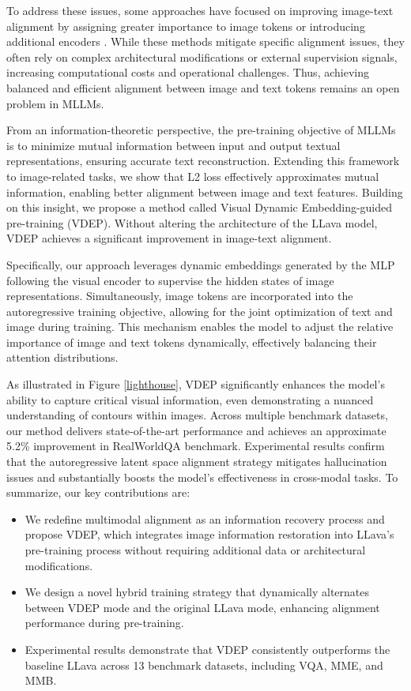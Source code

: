 To address these issues, some approaches have focused on improving image-text alignment by assigning greater importance to image tokens \cite{huang2024opera} or introducing additional encoders \cite{xing2024mitigating}. While these methods mitigate specific alignment issues, they often rely on complex architectural modifications or external supervision signals, increasing computational costs and operational challenges. Thus, achieving balanced and efficient alignment between image and text tokens remains an open problem in MLLMs.


From an information-theoretic perspective, the pre-training objective of MLLMs is to minimize mutual information between input and output textual representations, ensuring accurate text reconstruction. Extending this framework to image-related tasks, we show that L2 loss effectively approximates mutual information, enabling better alignment between image and text features. Building on this insight, we propose a method called Visual Dynamic Embedding-guided pre-training (VDEP). Without altering the architecture of the LLava model, VDEP achieves a significant improvement in image-text alignment.

Specifically, our approach leverages dynamic embeddings generated by the MLP following the visual encoder to supervise the hidden states of image representations. Simultaneously, image tokens are incorporated into the autoregressive training objective, allowing for the joint optimization of text and image during training. This mechanism enables the model to adjust the relative importance of image and text tokens dynamically, effectively balancing their attention distributions.

As illustrated in Figure \ref{lighthouse}, VDEP significantly enhances the model's ability to capture critical visual information, even demonstrating a nuanced understanding of contours within images. Across multiple benchmark datasets, our method delivers state-of-the-art performance and achieves an approximate 5.2\% improvement in RealWorldQA benchmark. Experimental results confirm that the autoregressive latent space alignment strategy mitigates hallucination issues and substantially boosts the model's effectiveness in cross-modal tasks.
To summarize, our key contributions are: 
\begin{itemize}
\item We redefine multimodal alignment as an information recovery process and propose VDEP, which integrates image information restoration into LLava's pre-training process without requiring additional data or architectural modifications.
\item We design a novel hybrid training strategy that dynamically alternates between VDEP mode and the original LLava mode, enhancing alignment performance during pre-training.
\item Experimental results demonstrate that VDEP consistently outperforms the baseline LLava across 13 benchmark datasets, including VQA, MME, and MMB.
\end{itemize}







